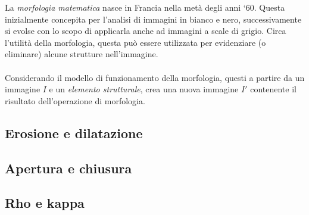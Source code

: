\documentclass{subfiles}
\begin{document}
La \emph{morfologia matematica} nasce in Francia nella metà degli anni `60.
Questa inizialmente concepita per l'analisi di immagini in bianco e nero, successivamente si evolse con lo scopo di applicarla anche ad immagini a scale di grigio.
Circa l'utilità della morfologia, questa può essere utilizzata per evidenziare (o eliminare) alcune strutture nell'immagine.
\\ \\
Considerando il modello di funzionamento della morfologia, questi a partire da un immagine \(I\) e un \emph{elemento strutturale\footnotemark[6]},
crea una nuova immagine \(I'\) contenente il risultato dell'operazione di morfologia.


\subsection{Erosione e dilatazione}

\clearpage

\subsection{Apertura e chiusura}

\clearpage

\subsection{Rho e kappa}

\clearpage
\end{document}
